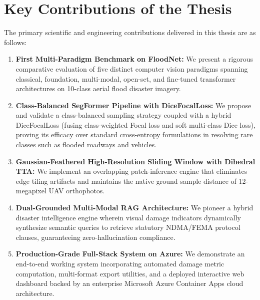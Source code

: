 \section{Key Contributions of the Thesis}
The primary scientific and engineering contributions delivered in this thesis are as follows:
\begin{enumerate}
    \item \textbf{First Multi-Paradigm Benchmark on FloodNet:} We present a rigorous comparative evaluation of five distinct computer vision paradigms spanning classical, foundation, multi-modal, open-set, and fine-tuned transformer architectures on 10-class aerial flood disaster imagery.
    \item \textbf{Class-Balanced SegFormer Pipeline with DiceFocalLoss:} We propose and validate a class-balanced sampling strategy coupled with a hybrid DiceFocalLoss (fusing class-weighted Focal loss and soft multi-class Dice loss), proving its efficacy over standard cross-entropy formulations in resolving rare classes such as flooded roadways and vehicles.
    \item \textbf{Gaussian-Feathered High-Resolution Sliding Window with Dihedral TTA:} We implement an overlapping patch-inference engine that eliminates edge tiling artifacts and maintains the native ground sample distance of 12-megapixel UAV orthophotos.
    \item \textbf{Dual-Grounded Multi-Modal RAG Architecture:} We pioneer a hybrid disaster intelligence engine wherein visual damage indicators dynamically synthesize semantic queries to retrieve statutory NDMA/FEMA protocol clauses, guaranteeing zero-hallucination compliance.
    \item \textbf{Production-Grade Full-Stack System on Azure:} We demonstrate an end-to-end working system incorporating automated damage metric computation, multi-format export utilities, and a deployed interactive web dashboard backed by an enterprise Microsoft Azure Container Apps cloud architecture.
\end{enumerate}

